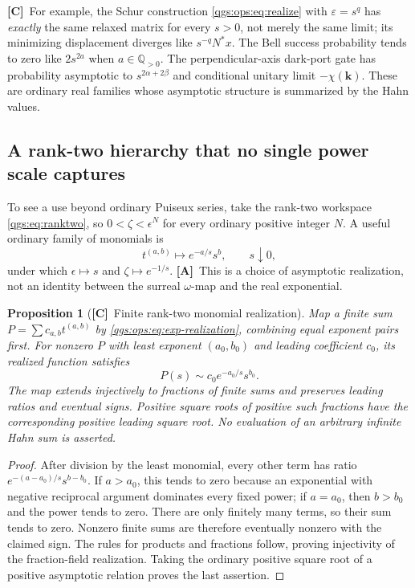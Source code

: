\documentclass[11pt,oneside]{article}
\numberwithin{equation}{section}
\theoremstyle{plain}
\newtheorem{proposition}[proposition]{Proposition}
\theoremstyle{definition}
\theoremstyle{remark}
\newcommand{\Q}{\mathbb Q}
\newcommand{\qk}{\mathbf k}
\newcommand{\TC}{\textcolor{TierC}{\textsf{\bfseries[C]}}}
\newcommand{\TA}{\textcolor{TierA}{\textsf{\bfseries[A]}}}
\begin{document}
\TC\ For example, the Schur construction \eqref{qgs:ops:eq:realize} with $\varepsilon=s^q$ has \emph{exactly} the same relaxed matrix for every $s>0$, not merely the same limit; its minimizing displacement diverges like $s^{-q}N^*x$. The Bell success probability tends to zero like $2s^{2a}$ when $a\in\Q_{>0}$. The perpendicular-axis dark-port gate has probability asymptotic to $s^{2\alpha+2\beta}$ and conditional unitary limit $-\chi(\qk)$. These are ordinary real families whose asymptotic structure is summarized by the Hahn values.

\subsection{A rank-two hierarchy that no single power scale captures}
To see a use beyond ordinary Puiseux series, take the rank-two workspace \eqref{qgs:eq:ranktwo}, so $0<\zeta<\epsilon^N$ for every ordinary positive integer $N$. A useful ordinary family of monomials is
\begin{equation}\label{qgs:ops:eq:exp-realization}
 t^{(a,b)}\longmapsto e^{-a/s}s^b,
 \qquad s\downarrow0,
\end{equation}
under which $\epsilon\mapsto s$ and $\zeta\mapsto e^{-1/s}$. \TA\ This is a choice of asymptotic realization, not an identity between the surreal $\omega$-map and the real exponential.

\begin{proposition}[\TC\ Finite rank-two monomial realization]\label{qgs:ops:prop:rank-two}
Map a finite sum $P=\sum c_{a,b}t^{(a,b)}$ by \eqref{qgs:ops:eq:exp-realization}, combining equal exponent pairs first. For nonzero $P$ with least exponent $(a_0,b_0)$ and leading coefficient $c_0$, its realized function satisfies
\begin{equation}\label{qgs:ops:eq:rank-two-leading}
 P(s)\sim c_0 e^{-a_0/s}s^{b_0}.
\end{equation}
The map extends injectively to fractions of finite sums and preserves leading ratios and eventual signs. Positive square roots of positive such fractions have the corresponding positive leading square root. No evaluation of an arbitrary infinite Hahn sum is asserted.
\end{proposition}
\begin{proof}
After division by the least monomial, every other term has ratio $e^{-(a-a_0)/s}s^{b-b_0}$. If $a>a_0$, this tends to zero because an exponential with negative reciprocal argument dominates every fixed power; if $a=a_0$, then $b>b_0$ and the power tends to zero. There are only finitely many terms, so their sum tends to zero. Nonzero finite sums are therefore eventually nonzero with the claimed sign. The rules for products and fractions follow, proving injectivity of the fraction-field realization. Taking the ordinary positive square root of a positive asymptotic relation proves the last assertion.
\end{proof}
\end{document}
